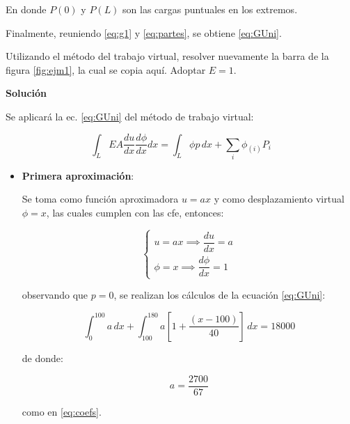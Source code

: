 En donde $P(0)$ y $P(L)$ son las cargas puntuales en los extremos.

Finalmente, reuniendo \eqref{eq:g1} y \eqref{eq:partes}, se obtiene \eqref{eq:GUni}.
\begin{example}
	Utilizando el método del trabajo virtual, resolver nuevamente la barra de la figura \ref{fig:ejm1}, la cual se copia aquí. Adoptar $E=1$.
	
	\begin{figure}[H]
		\centering
		
	\end{figure}
	
\textbf{Solución}

		Se aplicará la ec. \eqref{eq:GUni} del método de trabajo virtual:
		
		\begin{equation*}
			\int_L EA \dfrac{du}{dx} \dfrac{d \phi}{dx} dx = \int_L \phi p \, dx + \sum_i \phi_{(i)} P_i
		\end{equation*}
		
		\begin{itemize}
			\item \textbf{Primera aproximación}:
			
			Se toma como función aproximadora $u = ax$ y como desplazamiento virtual $\phi = x$, las cuales cumplen con las \acrlong{cfe}, entonces:
			
			\begin{equation}
				\begin{cases}
					u = a x \implies \dfrac{du}{dx} = a\\[4mm]
					\phi = x \implies \dfrac{d \phi}{dx} = 1
				\end{cases}
			\end{equation}
			
			observando que $p=0$, se realizan los cálculos de la ecuación \eqref{eq:GUni}:
			
			\begin{equation}
				\int_{0}^{100} a \, dx + \int_{100}^{180} a\left[1 + \dfrac{\left(x-100\right)}{40}\right]\, dx = 18000
			\end{equation}
			
			de donde:
			
			\begin{equation}
				a = \dfrac{2700}{67}
			\end{equation}
			
			como en \eqref{eq:coefs}.
			

\end{itemize}
\end{example}
